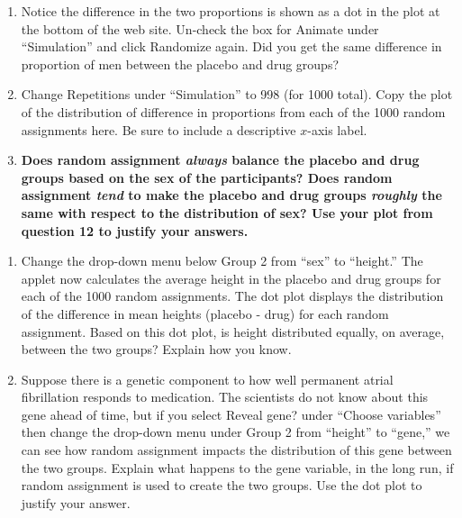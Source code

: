 \documentclass[
]{report}
\begin{document}
\begin{enumerate}
\def\labelenumi{\arabic{enumi}.}
\setcounter{enumi}{10}
\item
  Notice the difference in the two proportions is shown as a dot in the plot at the bottom of the web site. Un-check the box for Animate under ``Simulation'' and click Randomize again. Did you get the same difference in proportion of men between the placebo and drug groups?
  \vspace{0.25in}
\item
  Change Repetitions under ``Simulation'' to 998 (for 1000 total). Copy the plot of the distribution of difference in proportions from each of the 1000 random assignments here. Be sure to include a descriptive \(x\)-axis label.
  \vspace{1.25in}
\item
  \textbf{Does random assignment \emph{always} balance the placebo and drug groups based on the sex of the participants? Does random assignment \emph{tend} to make the placebo and drug groups \emph{roughly} the same with respect to the distribution of sex? Use your plot from question 12 to justify your answers.}
  \vspace{0.5in}
\end{enumerate}

\newpage

\begin{enumerate}
\def\labelenumi{\arabic{enumi}.}
\setcounter{enumi}{13}
\item
  Change the drop-down menu below Group 2 from ``sex'' to ``height.'' The applet now calculates the average height in the placebo and drug groups for each of the 1000 random assignments. The dot plot displays the distribution of the difference in mean heights (placebo - drug) for each random assignment. Based on this dot plot, is height distributed equally, on average, between the two groups? Explain how you know.
  \vspace{0.5in}
\item
  Suppose there is a genetic component to how well permanent atrial fibrillation responds to medication. The scientists do not know about this gene ahead of time, but if you select Reveal gene? under ``Choose variables'' then change the drop-down menu under Group 2 from ``height'' to ``gene,'' we can see how random assignment impacts the distribution of this gene between the two groups. Explain what happens to the gene variable, in the long run, if random assignment is used to create the two groups. Use the dot plot to justify your answer.
  \vspace{0.5in}
\end{enumerate}
\end{document}
